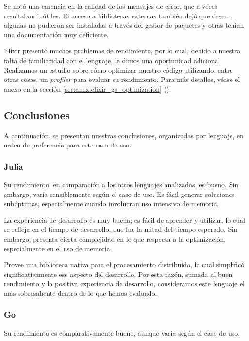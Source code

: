 \documentclass[11pt]{article}
\let\Oldsubsection\subsection
\renewcommand{\subsection}{\FloatBarrier\Oldsubsection}
\let\Oldsubsubsection\subsubsection
\renewcommand{\subsubsection}{\FloatBarrier\Oldsubsubsection}
\begin{document}
Se notó una carencia en la calidad de los mensajes de error, que a veces resultaban inútiles. El acceso a bibliotecas externas también dejó que desear; algunas no pudieron ser instaladas a través del gestor de paquetes y otras tenían una documentación muy deficiente.

Elixir presentó muchos problemas de rendimiento, por lo cual, debido a nuestra falta de familiaridad con el lenguaje, le dimos una oportunidad adicional. Realizamos un estudio sobre cómo optimizar nuestro código utilizando, entre otras cosas, un \textit{profiler} para evaluar su rendimiento. Para más detalles, véase el anexo en la sección \ref{sec:anex:elixir_gs_optimization} ().

\subsection{Conclusiones}

A continuación, se presentan nuestras conclusiones, organizadas por lenguaje, en orden de preferencia para este caso de uso.

\subsubsection{Julia}

Su rendimiento, en comparación a los otros lenguajes analizados, es bueno. Sin embargo, varía sensiblemente según el caso de uso. Es fácil generar soluciones subóptimas, especialmente cuando involucran uso intensivo de memoria.

La experiencia de desarrollo es muy buena; es fácil de aprender y utilizar, lo cual se refleja en el tiempo de desarrollo, que fue la mitad del tiempo esperado. Sin embargo, presenta cierta complejidad en lo que respecta a la optimización, especialmente en el uso de memoria.

Provee una biblioteca nativa para el procesamiento distribuido, lo cual simplificó significativamente ese aspecto del desarrollo. Por esta razón, sumada al buen rendimiento y la positiva experiencia de desarrollo, consideramos este lenguaje el más sobresaliente dentro de lo que hemos evaluado.

\subsubsection{Go}

Su rendimiento es comparativamente bueno, aunque varía según el caso de uso.
\end{document}
